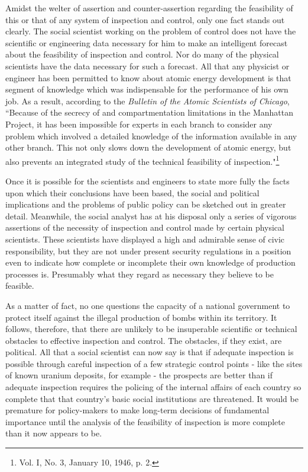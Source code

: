 \label{V-narco2}

Amidst the welter of assertion and counter-assertion regarding the feasibility of this or that of any system of inspection and control, only one fact stands out clearly. The social scientist working on the problem of control does not have the scientific or engineering data necessary for him to make an intelligent forecast about the feasibility of inspection and control. Nor do many of the physical scientists have the data necessary for such a forecast. All that any physicist or engineer has been permitted to know about atomic energy development is that segment of knowledge which was indispensable for the performance of his own job. As a result, according to the \emph{Bulletin of the Atomic Scientists of Chicago}, ``Because of the secrecy of and compartmentation limitations in the Manhattan Project, it has been impossible for experts in each branch to consider any problem which involved a detailed knowledge of the information available in any other branch. This not only slows down the development of atomic energy, but also prevents an integrated study of the technical feasibility of inspection."\footnote{Vol. I, No. 3, January 10, 1946, p. 2.}

Once it is possible for the scientists and engineers to state more fully the facts upon which their conclusions have been based, the social and political implications and the problems of public policy can be sketched out in greater detail. Meanwhile, the social analyst has at his disposal only a series of vigorous assertions of the necessity of inspection and control made by certain physical scientists. These scientists have displayed a high and admirable sense of civic responsibility, but they are not under present security regulations in a position even to indicate how complete or incomplete their own knowledge of production processes is. Presumably what they regard as necessary they believe to be feasible.

As a matter of fact, no one questions the capacity of a national government to protect itself against the illegal production of bombs within its territory. It follows, therefore, that there are unlikely to be insuperable scientific or technical obstacles to effective inspection and control. The obstacles, if they exist, are political. All that a social scientist can now say is that if adequate inspection is possible through careful inspection of a few strategic control points - like the sites of known uranium deposits, for example - the prospects are better than if adequate inspection requires the policing of the internal affairs of each country so complete that that country's basic social institutions are threatened. It would be premature for policy-makers to make long-term decisions of fundamental importance until the analysis of the feasibility of inspection is more complete than it now appears to be.

